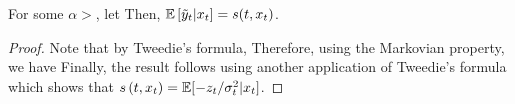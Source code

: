 \begin{lemma}\label{lemma:bootstrap_consistency_appendix}For some $\alpha > $, let
Then, $\mathbb{E}\left[\tilde{y}_{t}|x_{t}\right] = s(t, x_t)$.
\end{lemma}
\begin{proof}
    Note that by Tweedie's formula, 
    Therefore, using the Markovian property, we have
    Finally, the result follows using another application of Tweedie's formula which shows that $s\left(t, x_{t}\right) = \mathbb{E}[-z_{t}/\sigma_{t}^{2}|x_{t}]$.
\end{proof}

